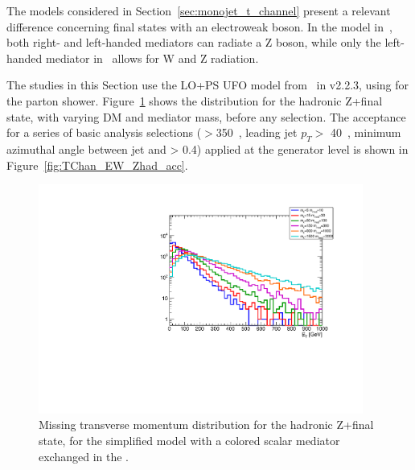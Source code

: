 The models considered in Section~\ref{sec:monojet_t_channel}
present a relevant difference concerning final states with an electroweak boson.
In the model in~\cite{Bell:2012rg}, both right- and left-handed mediators can radiate a Z boson,
while only the left-handed mediator in~\cite{Bell:2012rg} allows for W and Z radiation.

The studies in this Section use the LO+PS UFO model from~\cite{Bell:2012rg} in \madgraph v2.2.3, 
using  for the parton shower.
Figure~\ref{fig:TChan_EW_Zhad_MET} shows the \MET distribution for the hadronic Z+\MET final state, 
with varying DM and mediator mass, before any selection. 
The acceptance for a series of basic analysis selections
(\MET$>$350~\gev, leading jet $p_T >$ 40~\gev, minimum azimuthal angle between jet and \MET > 0.4) 
applied at the generator level is shown in Figure~\ref{fig:TChan_EW_Zhad_acc}. 

\begin{figure}[h!]
	\centering  
	\includegraphics[width=0.95\textwidth]{figures/EW/monoZhad_TChannel/metPt}
	\caption{Missing transverse momentum distribution for the hadronic Z+\MET final state,
		for the simplified model with a colored scalar mediator exchanged in the \tchannel.}
	\label{fig:TChan_EW_Zhad_MET}
\end{figure}


